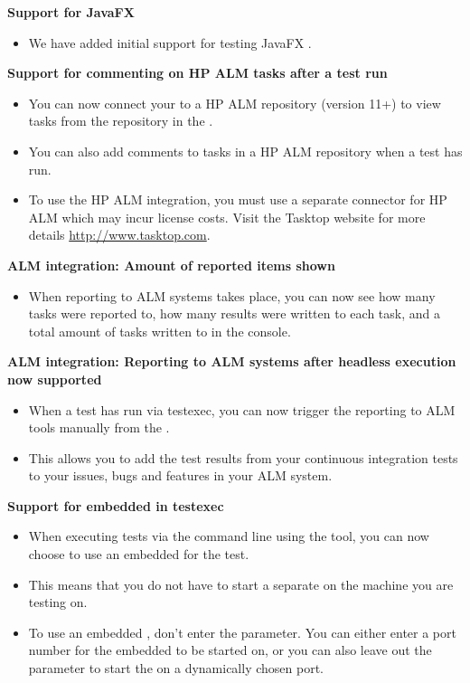 \textbf{Support for JavaFX \gdauts{}}
\begin{itemize}
\item We have added initial support for testing JavaFX \gdauts{}. 
\end{itemize}

\textbf{Support for commenting on HP ALM tasks after a test run}
\begin{itemize}
\item You can now connect your \ite{} to a HP ALM repository (version 11+) to view tasks from the repository in the \ite{}.
\item You can also add comments to tasks in a HP ALM repository when a test has run.
\item To use the HP ALM integration, you must use a separate connector for HP ALM which may incur license costs. Visit the Tasktop website for more details \url{http://www.tasktop.com}.
\end{itemize} 

\textbf{ALM integration: Amount of reported items shown}
\begin{itemize}
\item When reporting to ALM systems takes place, you can now see how many tasks were reported to, how many results were written to each task, and a total amount of tasks written to in the console.
\end{itemize}

\textbf{ALM integration: Reporting to ALM systems after headless execution now supported}
\begin{itemize}
\item When a test has run via testexec, you can now trigger the reporting to ALM tools manually from the \gdtestsummaryview{}. 
\item This allows you to add the test results from your continuous integration tests to your issues, bugs and features in your ALM system. 
\end{itemize}

\textbf{Support for embedded \gdagent{} in testexec}
\begin{itemize}
\item When executing tests via the command line using the  tool, you can now choose to use an embedded \gdagent{} for the test.
\item This means that you do not have to start a separate \gdagent{} on the machine you are testing on.
\item To use an embedded \gdagent{}, don't enter the  parameter. You can either enter a port number for the embedded \gdagent{} to be started on, or you can also leave out the  parameter to start the \gdagent{} on a dynamically chosen port.
\end{itemize}

